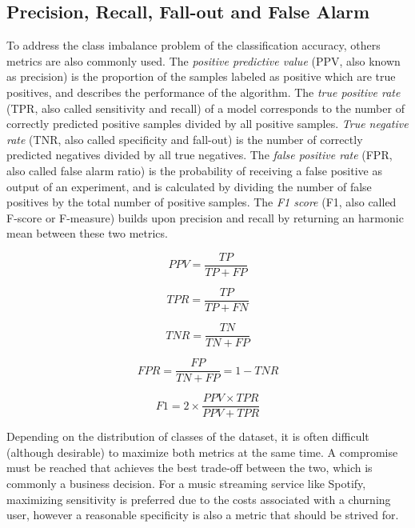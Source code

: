 \documentclass{kththesis}
\begin{document}
\subsection{Precision, Recall, Fall-out and False Alarm}

To address the class imbalance problem of the classification accuracy, others metrics are also commonly used. The \emph{positive predictive value} (PPV, also known as precision) is the proportion of the samples labeled as positive which are true positives, and describes the performance of the algorithm. The \emph{true positive rate} (TPR, also called sensitivity and recall) of a model corresponds to the number of correctly predicted positive samples divided by all positive samples. \emph{True negative rate} (TNR, also called specificity and fall-out) is the number of correctly predicted negatives divided by all true negatives. The \emph{false positive rate} (FPR, also called false alarm ratio) is the probability of receiving a false positive as output of an experiment, and is calculated by dividing the number of false positives by the total number of positive samples. The \emph{F1 score} (F1, also called F-score or F-measure) builds upon precision and recall by returning an harmonic mean between these two metrics.

\begin{equation}
PPV = \frac{TP}{TP + FP}
\end{equation}

\begin{equation}
TPR = \frac{TP}{TP + FN}
\end{equation}

\begin{equation}
TNR = \frac{TN}{TN + FP}
\end{equation}

\begin{equation}
FPR = \frac{FP}{TN + FP} = 1 - TNR
\end{equation}

\begin{equation}
F1 = 2 \times \frac{PPV \times TPR}{PPV + TPR}
\end{equation}

Depending on the distribution of classes of the dataset, it is often difficult (although desirable) to maximize both metrics at the same time. A compromise must be reached that achieves the best trade-off between the two, which is commonly a business decision. For a music streaming service like Spotify, maximizing sensitivity is preferred due to the costs associated with a churning user, however a reasonable specificity is also a metric that should be strived for. 
\end{document}
